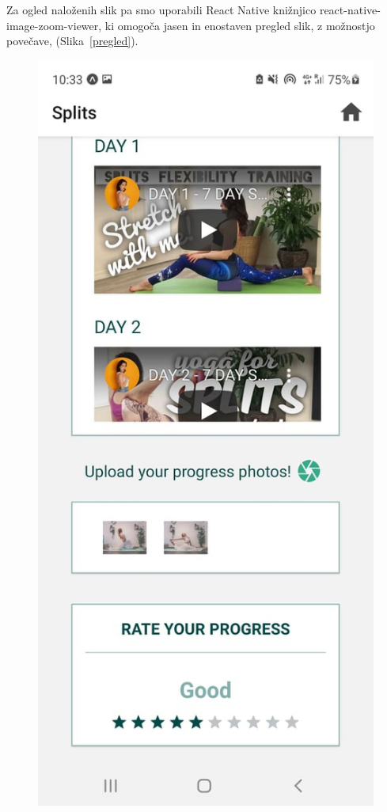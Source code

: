\documentclass[a4paper, 12pt]{book}
\begin{document}
Za ogled naloženih slik pa smo uporabili React Native knižnjico react-native-image-zoom-viewer, ki omogoča jasen in enostaven pregled slik, z možnostjo povečave, (Slika~\ref{pregled}).\\

\begin{figure}[ht]
\centering
  \begin{minipage}[b]{0.4\textwidth}
    \includegraphics[width=\textwidth]{splitsscreen.jpg}\centering

\end{minipage}
\end{figure}
\end{document}
